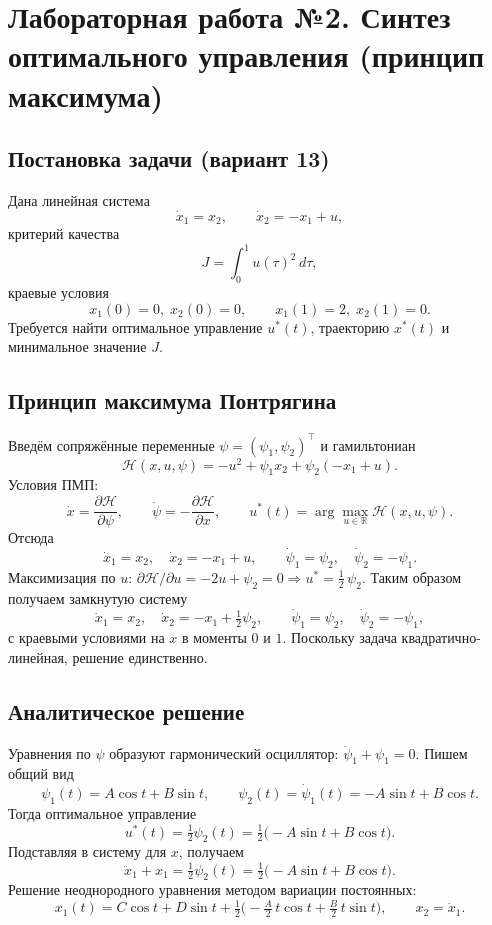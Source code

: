 \chapter{Лабораторная работа №2. Синтез оптимального управления (принцип максимума)}

\section*{Постановка задачи (вариант 13)}
Дана линейная система
\[
\dot x_1 = x_2,\qquad \dot x_2 = -x_1 + u,
\]
критерий качества
\[
J = \int_{0}^{1} u(\tau)^2\,d\tau,
\]
краевые условия
\[
 x_1(0)=0,\; x_2(0)=0,\qquad x_1(1)=2,\; x_2(1)=0.
\]
Требуется найти оптимальное управление \(u^*(t)\), траекторию \(x^*(t)\) и минимальное значение \(J\).

\section{Принцип максимума Понтрягина}
Введём сопряжённые переменные \(\psi=(\psi_1,\psi_2)^\top\) и гамильтониан
\[
\mathcal H(x,u,\psi)= -u^2 + \psi_1 x_2 + \psi_2(-x_1+u).
\]
Условия ПМП:
\[
\dot x = \frac{\partial \mathcal H}{\partial \psi},\qquad
\dot \psi = -\frac{\partial \mathcal H}{\partial x},\qquad
u^*(t)=\arg\max_{u\in\mathbb R} \mathcal H(x,u,\psi).
\]
Отсюда
\[
\dot x_1=x_2,\quad \dot x_2=-x_1+u,\qquad
\dot\psi_1=\psi_2,\quad \dot\psi_2=-\psi_1.
\]
Максимизация по \(u\): \(\partial \mathcal H/\partial u=-2u+\psi_2=0\Rightarrow u^*=\tfrac{1}{2}\,\psi_2\).
Таким образом получаем замкнутую систему
\[
\dot x_1=x_2,\quad \dot x_2=-x_1+\tfrac{1}{2}\psi_2,\qquad
\dot\psi_1=\psi_2,\quad \dot\psi_2=-\psi_1,
\]
с краевыми условиями на \(x\) в моменты \(0\) и \(1\). Поскольку задача квадратично-линейная, решение единственно.

\section{Аналитическое решение}
Уравнения по \(\psi\) образуют гармонический осциллятор: \(\ddot\psi_1+\psi_1=0\). Пишем общий вид
\[
\psi_1(t)=A\cos t + B\sin t,\qquad \psi_2(t)=\dot\psi_1(t)=-A\sin t + B\cos t.
\]
Тогда оптимальное управление
\[
 u^*(t)=\tfrac{1}{2}\psi_2(t)=\tfrac{1}{2}\big(-A\sin t + B\cos t\big).
\]
Подставляя в систему для \(x\), получаем
\[
\ddot x_1 + x_1 = \tfrac{1}{2}\psi_2(t) = \tfrac{1}{2}\big(-A\sin t + B\cos t\big).
\]
Решение неоднородного уравнения методом вариации постоянных:
\[
 x_1(t)=C\cos t + D\sin t + \tfrac{1}{2}\Big( -\tfrac{A}{2}\,t\cos t + \tfrac{B}{2}\,t\sin t \Big),\qquad x_2=\dot x_1.
\]

